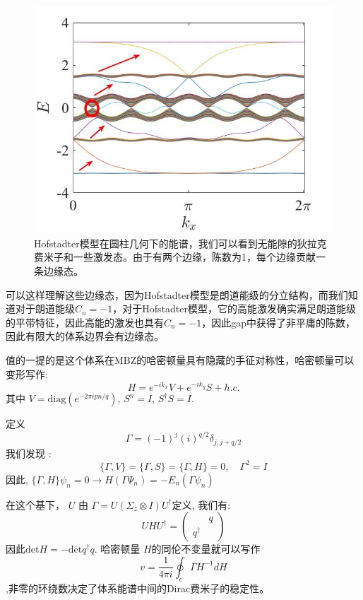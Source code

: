 \documentclass[supercite]{HustGraduPaper}
\begin{document}
\begin{figure}
	\centering
	\includegraphics[width=0.7\linewidth]{Figures/topoinsu/band}
	\caption{Hofstadter模型在圆柱几何下的能谱，我们可以看到无能隙的狄拉克费米子和一些激发态。由于有两个边缘，陈数为1，每个边缘贡献一条边缘态。}
	\label{fig:band}
\end{figure}

可以这样理解这些边缘态，因为Hofstadter模型是朗道能级的分立结构，而我们知道对于朗道能级$C_n = -1$，对于Hofstadter模型，它的高能激发确实满足朗道能级
的平带特征，因此高能的激发也具有$C_n = -1$，因此gap中获得了非平庸的陈数，因此有限大的体系边界会有边缘态。

值的一提的是这个体系在MBZ的哈密顿量具有隐藏的手征对称性\cite{wen1989winding}，哈密顿量可以变形写作:
\begin{equation}
H = e^{-ik_x} V + e^{-ik_y} S + h.c.
\end{equation}
其中 $V = \text{diag}(e^{-2\pi i pn/q})$, $S^n = I$, $S^\dagger S = I$.

定义 
\begin{equation}\label{eq:Gamma}
\Gamma = (-1)^j (i)^{q/2} \delta_{j,j+q/2}
\end{equation}
我们发现 :
\begin{equation}
\{\Gamma, V\} = \{\Gamma, S\} = \{\Gamma, H\} = 0, \quad \Gamma^2 = I
\end{equation}
因此, $\{\Gamma,H\} \psi_n = 0 \to H(\Gamma\Psi_n) = -E_n (\Gamma \psi_n)$

在这个基下， $U$ 由 $\Gamma = U (\Sigma_z \otimes I) U^\dagger$定义, 我们有:
\begin{equation}
U H U^\dagger = \left(\begin{array}{cc}
& q \\ 
q^\dagger & 
\end{array} \right)
\end{equation}
因此$\text{det} H = -\text{det} q^\dagger q$. 哈密顿量 $H$的同伦不变量就可以写作 $$v  = \frac{1}{4\pi i} \oint_c \Gamma H^{-1} d H$$,非零的环绕数决定了体系能谱中间的Dirac费米子的稳定性。
\end{document}

